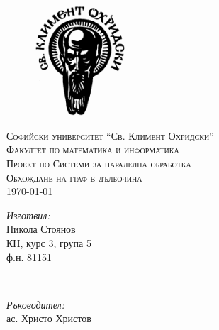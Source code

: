 %
%
%
%

\begin{titlepage}

\center

\begin{figure}[h]
  \centering
  \includegraphics[width=0.3\textwidth]{resources/logo.png}
\end{figure}

\textsc{\large Софийски университет ``Св. Климент Охридски''}\\[0.5cm]
\textsc{\large Факултет по математика и информатика}\\[1.5cm]

\textsc{\Large Проект по Системи за паралелна обработка}\\[0.5cm]
\textsc{\large Обхождане на граф в дълбочина}\\[1.5cm]

{\large \today}\\[2cm]

\begin{minipage}[t][][t]{0.45\linewidth}
\begin{flushleft} \large
\emph{Изготвил:}\\
Никола Стоянов\\
КН, курс 3, група 5\\
ф.н. 81151
\end{flushleft}
\end{minipage}
~
\begin{minipage}[t][][t]{0.45\linewidth}
\begin{flushright} \large
\emph{Ръководител:} \\
ас. Христо Христов
\end{flushright}
\end{minipage}\\[2cm]


\end{titlepage}
